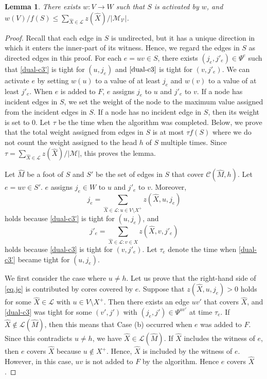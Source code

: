 \documentclass[11pt]{article}
\newtheorem{lemma}{Lemma}
\newcommand{\Mfam}{\mathcal{M}}
\newcommand{\Cfam}{\mathcal{C}}
\newcommand{\Vfam}{\mathcal{V}}
\newcommand{\Lfam}{\mathcal{L}}
\begin{document}
\begin{lemma}\label{lem.spider-lp}
 There exists $w\colon V \rightarrow W$ such that $S$ is
 activated by $w$, and $w(V)/f(S) \leq \sum_{\hat{X} \in
 \Lfam}z(\hat{X})/|\Mfam_{\Vfam}|$.
\end{lemma}
\begin{proof}
 Recall that each edge in $S$ is undirected, but it has a unique
 direction in which it enters the inner-part of its witness.
 Hence, we regard the edges in $S$ as directed edges in this proof.
 For each $e=uv \in S$,
 there exists $(j_e,j'_e)\in \Psi^{e}$
 such that 
 \eqref{dual-c3'} is tight for 
 $(u,j_e)$ and $\eqref{dual-c3}$ is tight for $(v,j'_e)$.
 We can activate $e$ by setting $w(u)$ to a value of at least $j_e$ and
 $w(v)$ to a value of at least $j'_e$.
 When $e$ is added to $F$, $e$ assigns $j_e$ to $u$ and $j'_e$ to $v$.
 If a node has incident edges in $S$,
 we set the weight of the node to the maximum value assigned from the
 incident edges in $S$.
 If a node has no incident edge in $S$, then its weight is set to $0$.
 Let $\tau$ be the time when the algorithm was completed.
 Below, we prove that the total weight assigned from edges in $S$
 is at most $\tau f(S)$ where we do not count
 the weight assigned to the head $h$ of $S$ multiple times.
  Since $\tau = \sum_{\hat{X}\in \Lfam}z(\hat{X})/|\Mfam|$, this proves
 the lemma.

 Let $\hat{M}$ be a foot of $S$ and
 $S'$ be the set of edges in $S$ that cover $\Cfam(\hat{M},h)$.
 Let $e=uv \in S'$.  $e$ assigns $j_e \in W$
 to $u$  and $j'_e$ to $v$.
 Moreover,
\begin{equation}
 j_e=\sum_{\hat{X} \in \Lfam: u\in V \setminus X^+}z(\hat{X},u,j_e)
\label{eq.je}
\end{equation}
 holds because \eqref{dual-c3'} is tight for $(u,j_e)$,
 and 
\begin{equation}
 j'_e=\sum_{\hat{X} \in \Lfam: v\in X}z(\hat{X},v,j'_e) 
\label{eq.je'}
\end{equation}
 holds because \eqref{dual-c3} is tight for $(v,j'_e)$. 
 Let $\tau_e$ denote the time when  \eqref{dual-c3'} became tight for $(u,j_e)$.

 We first consider the case where $u \neq h$.
 Let us prove that the right-hand side of \eqref{eq.je} is contributed
 by cores covered by $e$. 
 Suppose that $z(\hat{X},u,j_{e})>0$ holds for some $\hat{X} \in \Lfam$ with
 $u \in V \setminus X^+$. 
 Then there exists an edge
 $uv'$ that covers $\hat{X}$, and
 \eqref{dual-c3} was tight for some $(v',j')$
 with $(j_e,j') \in \Psi^{uv'}$
 at time $\tau_e$.
  If $\hat{X} \not\in \Lfam(\hat{M})$,
 then
 this means that Case (b) occurred when $e$ was added to $F$.
 Since this contradicts $u\neq h$,
 we have $\hat{X} \in \Lfam(\hat{M})$.
 If $\hat{X}$ includes the witness of $e$,
 then $e$ covers $\hat{X}$ because $u \not\in X^+$.
 Hence,
 $\hat{X}$ is included by the
 witness of $e$. However, in this case, 
 $uv$ is not added to $F$ by the algorithm.
 Hence $e$ covers $\hat{X}$.


\end{proof}
\end{document}
